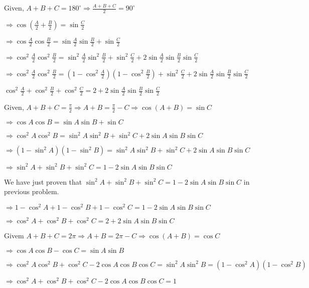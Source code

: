 \item Given, $A + B + C = 180^\circ \Rightarrow \frac{A + B + C}{2} = 90^\circ$

  $\Rightarrow \cos\left(\frac{A}{2} + \frac{B}{2}\right) = \sin\frac{C}{2}$

  $\Rightarrow \cos\frac{A}{2}\cos\frac{B}{2} = \sin\frac{A}{2}\sin\frac{B}{2} + \sin\frac{C}{2}$

  $\Rightarrow \cos^2\frac{A}{2}\cos^2\frac{B}{2} = \sin^2\frac{A}{2}\sin^2\frac{B}{2} + \sin^2\frac{C}{2} +
  2\sin\frac{A}{2}\sin\frac{B}{2}\sin\frac{C}{2}$

  $\Rightarrow \cos^2\frac{A}{2}\cos^2\frac{B}{2} = \left(1 - \cos^2\frac{A}{2}\right)\left(1 - \cos^2\frac{B}{2}\right) +
  \sin^2\frac{C}{2} + 2\sin\frac{A}{2}\sin\frac{B}{2}\sin\frac{C}{2}$

  $\cos^2\frac{A}{2} + \cos^2\frac{B}{2} + \cos^2\frac{C}{2} = 2 + 2\sin\frac{A}{2}\sin\frac{B}{2}\sin\frac{C}{2}$

\item Given, $A + B + C = \frac{\pi}{2} \Rightarrow A + B = \frac{\pi}{2} - C \Rightarrow \cos(A + B) = \sin C$

  $\Rightarrow \cos A\cos B = \sin A\sin B + \sin C$

  $\Rightarrow \cos^2A\cos^2B = \sin^2A\sin^2B + \sin^2C + 2\sin A\sin B\sin C$

  $\Rightarrow (1 - \sin^2A)(1 - \sin^2B) = \sin^2A\sin^2B + \sin^2C + 2\sin A\sin B\sin C$

  $\Rightarrow \sin^2A + \sin^2B + \sin^2C = 1 - 2\sin A\sin B\sin C$

\item We have just proven that $\sin^2A + \sin^2B + \sin^2C = 1 - 2\sin A\sin B\sin C$ in previous problem.

  $\Rightarrow 1 - \cos^2A + 1 - \cos^2B + 1 - \cos^2C = 1 - 2\sin A\sin B\sin C$

  $\Rightarrow \cos^2A + \cos^2B + \cos^2C = 2 + 2\sin A\sin B\sin C$

\item Givem $A + B + C = 2\pi \Rightarrow A + B = 2\pi - C \Rightarrow \cos(A + B) = \cos C$

  $\Rightarrow \cos A\cos B - \cos C = \sin A\sin B$

  $\Rightarrow \cos^2A\cos^2B + \cos^2C - 2\cos A\cos B\cos C = \sin^2A\sin^2B = (1 - \cos^2A)(1 - \cos^2B)$

  $\Rightarrow \cos^2A + \cos^2B + \cos^2C - 2\cos A\cos B\cos C = 1$

